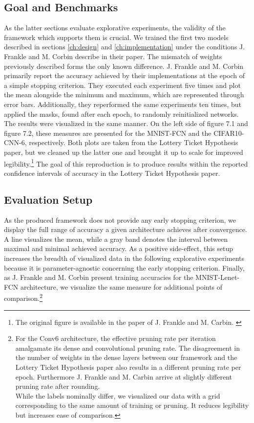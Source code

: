 \subsection*{Goal and Benchmarks}
As the latter sections evaluate explorative experiments, the validity of the framework which supports them is crucial. We trained the first two models described in sections \ref{ch:design} and \ref{ch:implementation} under the conditions J. Frankle and M. Corbin describe in their paper. The mismatch of weights previously described forms the only known difference.
J. Frankle and M. Corbin primarily report the accuracy achieved by their implementations at the epoch of a simple stopping criterion. They executed each experiment five times and plot the mean alongside the minimum and maximum, which are represented through error bars. Additionally, they reperformed the same experiments ten times, but applied the masks, found after each epoch, to randomly reinitialized networks. The results were visualized in the same manner. \cite{LTH}
On the left side of figure 7.1 and figure 7.2, these measures are presented for the MNIST-FCN and the CIFAR10-CNN-6, respectively. Both plots are taken from the Lottery Ticket Hypothesis paper, but we cleaned up the latter one and brought it up to scale for improved legibility.\footnote{The original figure is available in the paper of J. Frankle and M. Carbin. \cite{LTH}}  The goal of this reproduction is to produce results within the reported confidence intervals of accuracy in the Lottery Ticket Hypothesis paper.  

\subsection*{Evaluation Setup}
As the produced framework does not provide any early stopping criterion, we display the full range of accuracy a given architecture achieves after convergence. A line visualizes the mean, while a gray band denotes the interval between maximal and minimal achieved accuracy. As a positive side-effect, this setup increases the breadth of visualized data in the following explorative experiments because it is parameter-agnostic concerning the early stopping criterion. Finally,  as J. Frankle and M. Corbin present training accuracies for the MNIST-Lenet-FCN architecture, we visualize the same measure for additional points of comparison.\footnote{For the Conv6 architecture, the effective pruning rate per iteration amalgamate its dense and convolutional pruning rate. The disagreement in the number of weights in the dense layers between our framework and the Lottery Ticket Hypothesis paper also results in a different pruning rate per epoch. Furthermore J. Frankle and M. Carbin arrive at slightly different pruning rate after rounding.\\ While the labels nominally differ, we visualized our data with a grid corresponding to the same amount of training or pruning. It reduces legibility but increases ease of comparison.
} 
